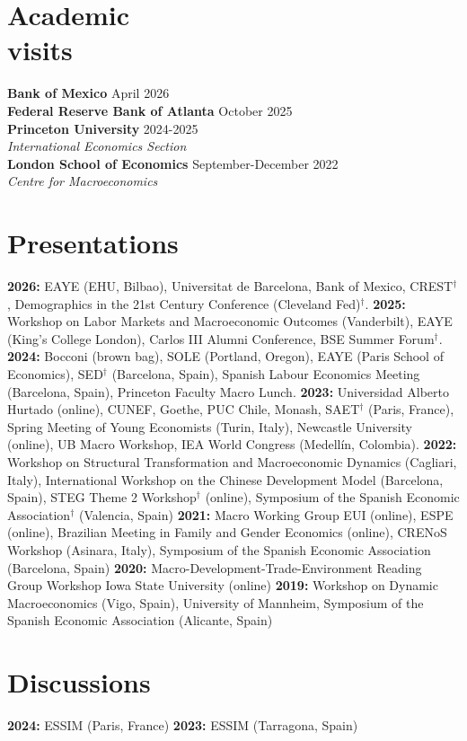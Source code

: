 \documentclass[margin]{res} %
\begin{document}
\begin{resume}
\section{Academic \\ visits}
{\bf Bank of Mexico} \hfill April 2026  \\
{\bf Federal Reserve Bank of Atlanta} \hfill October 2025  \\
{\bf Princeton University} \hfill 2024-2025  \\
{\sl International Economics Section} \\
{\bf London School of Economics} \hfill September-December 2022  \\
{\sl Centre for Macroeconomics}

\section{Presentations}

{\bf 2026:} EAYE (EHU, Bilbao), Universitat de Barcelona, Bank of Mexico, CREST$^\dagger$, Demographics in the 21st Century Conference (Cleveland Fed)$^\dagger$.
{\bf 2025:} Workshop on Labor Markets and Macroeconomic Outcomes (Vanderbilt), EAYE (King's College London), Carlos III Alumni Conference, BSE Summer Forum$^\dagger$. 
{\bf 2024:} Bocconi (brown bag), SOLE (Portland, Oregon), EAYE (Paris School of Economics), SED$^\dagger$ (Barcelona, Spain), Spanish Labour Economics Meeting (Barcelona, Spain), Princeton Faculty Macro Lunch. {\bf 2023:} Universidad Alberto Hurtado (online), CUNEF, Goethe, PUC Chile, Monash, SAET$^\dagger$ (Paris, France), Spring Meeting of Young Economists (Turin, Italy), Newcastle University (online), UB Macro Workshop, IEA World Congress (Medell\'in, Colombia). {\bf 2022:} Workshop on Structural Transformation and Macroeconomic Dynamics (Cagliari, Italy), International Workshop on the Chinese Development Model (Barcelona, Spain), STEG Theme 2 Workshop$^\dagger$ (online), Symposium of the Spanish Economic Association$^\dagger$ (Valencia, Spain) {\bf 2021:} Macro Working Group EUI (online), ESPE (online), Brazilian Meeting in Family and Gender Economics (online), CRENoS Workshop (Asinara, Italy), Symposium of the Spanish Economic Association (Barcelona, Spain) {\bf 2020:} Macro-Development-Trade-Environment Reading Group Workshop Iowa State University (online) {\bf 2019:} Workshop on Dynamic Macroeconomics (Vigo, Spain), University of Mannheim, Symposium of the Spanish Economic Association (Alicante, Spain)

\section{Discussions}
{\bf 2024:} ESSIM (Paris, France) {\bf 2023:} ESSIM (Tarragona, Spain)


\end{resume}
\end{document}
